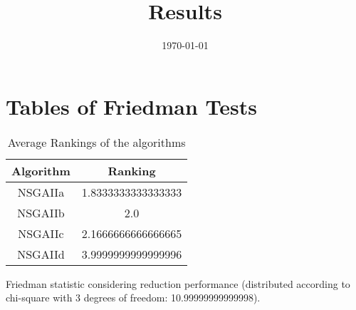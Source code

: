\documentclass{article}
\title{Results}
\author{}
\date{\today}
\begin{document}
\oddsidemargin 0in \topmargin 0in\maketitle
\section{Tables of Friedman Tests}
\begin{table}[!htp]
\centering
\caption{Average Rankings of the algorithms
}\begin{tabular}{c|c}
Algorithm&Ranking\\
\hline
NSGAIIa&1.8333333333333333\\
NSGAIIb&2.0\\
NSGAIIc&2.1666666666666665\\
NSGAIId&3.9999999999999996\\
\end{tabular}
\end{table}


Friedman statistic considering reduction performance (distributed according to chi-square with 3 degrees of freedom: 10.99999999999998).
\end{document}
